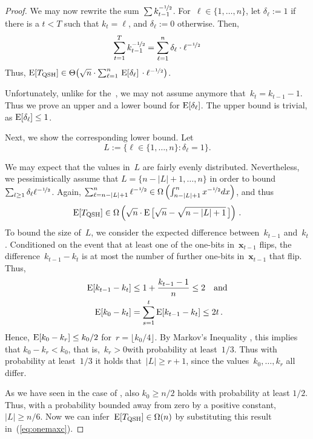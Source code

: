 \begin{proof}
We may now rewrite the sum~$\sum k_{t-1}^{-\nicefrac{1}{2}}$. For~$\ell\in\{1,\dots,n\}$, let $\delta_\ell := 1$ if there is a $t<T$ such that $ k_t=\ell$, and $\delta_\ell := 0$ otherwise. Then,
\[
\sum_{t=1}^{T}k_{t-1}^{-\nicefrac{1}{2}}=\sum_{\ell=1}^n\delta_\ell\cdot\ell^{-\nicefrac{1}{2}}
\]
Thus, $\operatorname{E}[T_{\mathrm{QSH}}]\in\Theta\big(\sqrt{n}\cdot\sum_{\ell=1}^n\,\operatorname{E}[\delta_\ell]\,\cdot\ell^{-\nicefrac{1}{2}}\big)$.


Unfortunately, unlike for the~\qrls, we may not assume anymore that~$k_t = k_{t-1}-1$. Thus we prove an upper and a lower bound for $\operatorname{E}[\delta_{\ell}]$. The upper bound is trivial, as $\operatorname{E}[\delta_{\ell}] \leq 1$. 

Next, we show the corresponding lower bound. Let
\[L:=\{\ell\in\{1,\dots,n\}\colon \delta_\ell = 1\}.\]

We may expect that the values in~$L$ are fairly evenly distributed. Nevertheless, we pessimistically assume that $L=\{n-|L|+1,\dots,n\}$ in order to bound $\sum_{l\geq 1}\delta_\ell\ell^{-\nicefrac{1}{2}}$. Again, $\sum_{\ell=n-|L|+1}^n\ell^{-\nicefrac{1}{2}}\in\Omega\left(\int_{n-|L|+1}^n x^{-\nicefrac{1}{2}}dx\right)$, and thus
\begin{equation}
\label{eq:onemaxc}
\operatorname{E}[T_{\mathrm{QSH}}]\in\Omega\left(\sqrt{n}\cdot\operatorname{E}\big[\sqrt{n}-\sqrt{n-|L|+1}\,\big]\right)\,.
\end{equation}
To bound the size of~$L$, we consider the expected difference between~$k_{t-1}$ and~$k_t$. Conditioned on the event that at least one of the one-bits in~$\mathbf{x}_{t-1}$ flips, the difference~$k_{t-1}-k_{t}$ is at most the number of further one-bits in~$\mathbf{x}_{t-1}$ that flip. Thus,
\begin{align*}
\operatorname{E}[k_{t-1}-k_{t}]&\le 1+\frac{k_{t-1}-1}{n}\le 2\quad\textnormal{and} \\
\operatorname{E}[k_0-k_t]&=\sum_{s=1}^{t}\operatorname{E}[k_{t-1}-k_t]\le 2t\,.
\end{align*}
Hence, $\operatorname{E}[k_0-k_r]\le k_0/2$ for~$r=\lfloor k_0/4\rfloor$. By Markov's In\-equality \cite{MitzemacherU05}, this implies that $k_0-k_r<k_0$, that is,~$k_r>0$\linebreak[4] with probability at least~$1/3$. Thus with probability at least~$1/3$ it holds that~$|L|\ge r+1$, since the values~$k_0,\hdots,k_r$ all differ.

As we have seen in the case of \qrls, also $k_0\ge n/2$ holds with probability at least $1/2$. Thus, with a probability bounded away from zero by a positive constant,~$|L|\ge n/6$. Now we can infer~$\operatorname{E}[T_{\mathrm{QSH}}]\in\Omega(n)$ by substituting this result in~(\ref{eq:onemaxc}).
\end{proof}

